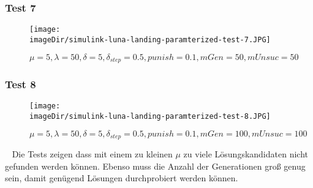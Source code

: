 \subsubsection{Test 7}
\begin{figure}[h]
	\centering
	\texttt{[image: \\imageDir/simulink-luna-landing-paramterized-test-7.JPG]}
	\caption{$\mu=5, \lambda=50, \delta=5, \delta_{step}=0.5, punish=0.1, mGen=50, mUnsuc=50 $}
	\label{fig:simulink-luna-landing-paramterized-test-7}
\end{figure}

\subsubsection{Test 8}
\begin{figure}[h]
	\centering
	\texttt{[image: \\imageDir/simulink-luna-landing-paramterized-test-8.JPG]}
	\caption{$\mu=5, \lambda=50, \delta=5, \delta_{step}=0.5, punish=0.1, mGen=100, mUnsuc=100 $}
	\label{fig:simulink-luna-landing-paramterized-test-8}
\end{figure}
\ \newline
Die Tests zeigen dass mit einem zu kleinen $\mu$ zu viele Lösungskandidaten nicht gefunden werden können. Ebenso muss die Anzahl der Generationen groß genug sein, damit genügend Lösungen durchprobiert werden können.  
